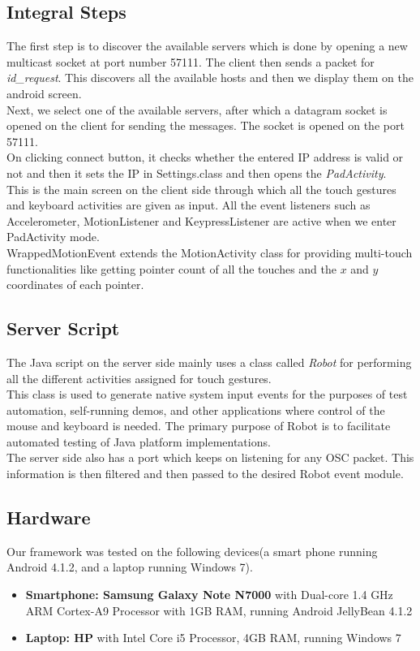 \documentclass[10pt,conference,letterpaper]{IEEEtran}
\begin{document}
\subsection{Integral Steps}
The first step is to discover the available servers which is done by opening a new multicast socket at port number 57111. The client then  sends a packet for \emph{id\_request}. This discovers all the available hosts and then we display them on the android screen.\\
Next, we select one of the available servers, after which a datagram socket is opened on the client for sending the messages. The socket is opened on the port 57111.\\
On clicking connect button, it checks whether the entered IP address is valid or not and then it sets the IP in Settings.class and then opens the \emph{PadActivity}.\\
This is the main screen on the client side through which all the touch gestures and keyboard activities are given as input. All the event listeners such as Accelerometer, MotionListener and KeypressListener are active when we enter PadActivity mode.\\
WrappedMotionEvent extends the MotionActivity class for providing multi-touch functionalities like getting pointer count of all the touches and the $x$ and $y$ coordinates of each pointer.

\subsection{Server Script}
The Java script on the server side mainly uses a class called \emph{Robot} for performing all the different activities assigned for touch gestures.\\
This class is used to generate native system input events for the purposes of test automation, self-running demos, and other applications where control of the mouse and keyboard is needed. The primary purpose of Robot is to facilitate automated testing of Java platform implementations.\\
The server side also has a port which keeps on listening for any OSC packet. This information is then filtered and then passed to the desired Robot event module.

\subsection{Hardware}
Our framework was tested on the following devices(a smart phone running Android 4.1.2, and a laptop running Windows 7).
\begin{itemize}
\item \textbf{Smartphone: Samsung Galaxy Note N7000} with Dual-core 1.4 GHz ARM Cortex-A9 Processor with 1GB RAM, running Android JellyBean 4.1.2
\item \textbf{Laptop: HP} with Intel Core i5 Processor, 4GB RAM, running Windows 7\\
\end{itemize}
\end{document}
